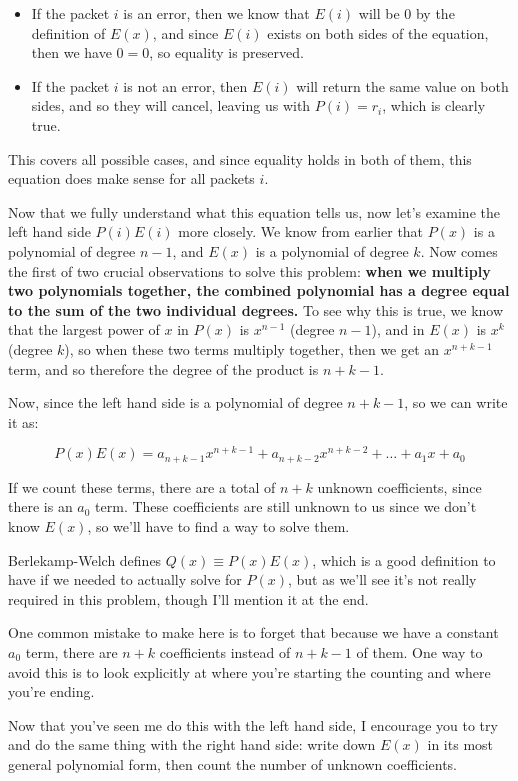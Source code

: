 \documentclass[10pt]{article}
\begin{document}
    \begin{itemize}
        \item If the packet $i$ is an error, then we know that $E(i)$ will be 0 by the definition of $E(x)$, and since $E(i)$ exists on both sides of the equation, then we have $0=0$, so equality is preserved. 
        \item If the packet $i$ is not an error, then $E(i)$ will return the same value on both sides, and so they will cancel, leaving us with $P(i) = r_i$, which is clearly true.
    \end{itemize}

    This covers all possible cases, and since equality holds in both of them, this equation does make sense for all packets $i$. 

    Now that we fully understand what this equation tells us, now let's examine the left hand side $P(i)E(i)$ more closely. We know from earlier that $P(x)$ is a polynomial of degree $n-1$, and $E(x)$ is a polynomial of degree $k$. Now comes the first of two crucial observations to solve this problem: \textbf{when we multiply two polynomials together, the combined polynomial has a degree equal to the sum of the two individual degrees.} To see why this is true, we know that the largest power of $x$ in $P(x)$ is $x^{n-1}$ (degree $n-1$), and in $E(x)$ is $x^k$ (degree $k$), so when these two terms multiply together, then we get an $x^{n+k-1}$ term, and so therefore the degree of the product is $n+k-1$. 

    Now, since the left hand side is a polynomial of degree $n+k-1$, so we can write it as:

    \[ P(x)E(x) = a_{n+k-1}x^{n+k-1} + a_{n+k-2}x^{n+k-2} + \dots + a_1x + a_0\] 

    If we count these terms, there are a total of $n+k$ unknown coefficients, since there is an $a_0$ term. These coefficients are still unknown to us since we don't know $E(x)$, so we'll have to find a way to solve them. 

    \begin{aside*}{}{}
        Berlekamp-Welch defines $Q(x) \equiv P(x)E(x)$, which is a good definition to have if we needed to actually solve for $P(x)$, but as we'll see it's not really required in this problem, though I'll mention it at the end.
    \end{aside*}

    \begin{guidance*}{}{}
        One common mistake to make here is to forget that because we have a constant $a_0$ term, there are $n+k$ coefficients instead of $n+k-1$ of them. One way to avoid this is to look explicitly at where you're starting the counting and where you're ending. 

        Now that you've seen me do this with the left hand side, I encourage you to try and do the same thing with the right hand side: write down $E(x)$ in its most general polynomial form, then count the number of unknown coefficients. 
    \end{guidance*}
\end{document}
